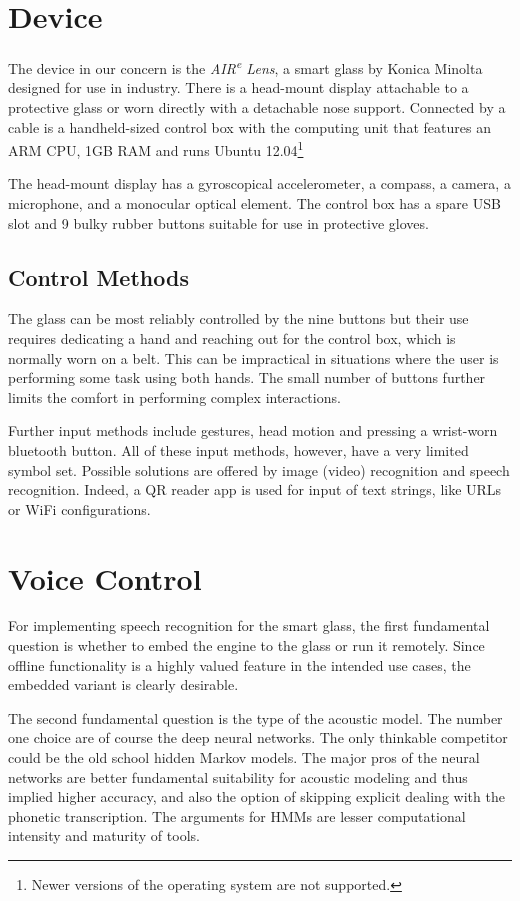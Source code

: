 \documentclass{llncs}
\begin{document}
\section{Device}

The device in our concern is the {\em AIR\textsuperscript{e} Lens}, a smart glass by
Konica Minolta designed for use in industry. There
is a head-mount display attachable to a protective glass or worn
directly with a detachable nose support. Connected by a cable is a
handheld-sized control box with the computing unit that features an ARM CPU, 1GB RAM and
runs Ubuntu 12.04\footnote{Newer versions of the operating system are not
supported.}

The head-mount display has a gyroscopical accelerometer, a compass, a camera, a
microphone, and a monocular optical element. The control box has a spare USB
slot and 9 bulky rubber buttons suitable for use in protective gloves.

\subsection{Control Methods}

The glass can be most reliably controlled by the nine buttons but their use
requires dedicating a hand and reaching out for the control box, which is
normally worn on a belt. This can be impractical in situations where the user is
performing some task using both hands. The small number of buttons further
limits the comfort in performing complex interactions.

Further input methods include gestures, head motion and pressing a wrist-worn
bluetooth button. All of these input methods, however, have a very limited
symbol set. Possible solutions are offered by image (video) recognition and
speech recognition. Indeed, a QR reader app is used for input of text strings,
like URLs or WiFi configurations.

\section{Voice Control}

For implementing speech recognition for the smart glass, the first fundamental
question is whether to embed the engine to the glass or run it remotely. Since
offline functionality is a highly valued feature in the intended use cases, the
embedded variant is clearly desirable.

The second fundamental question is the type of the acoustic model. The number
one choice are of course the deep neural networks. The only thinkable competitor
could be the old school hidden Markov models. The major pros of the neural
networks are better fundamental suitability for acoustic modeling and thus
implied higher accuracy, and also the option of skipping explicit dealing with
the phonetic transcription.
The arguments for HMMs are lesser computational intensity and maturity of tools.
\end{document}
